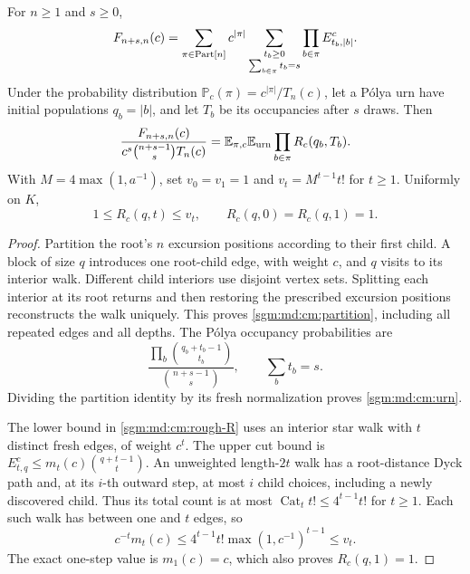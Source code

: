 \documentclass[11pt,letterpaper]{article}
\theoremstyle{remark}\newtheorem{remark}[theorem]{Remark}
\newcommand{\Cat}{\operatorname{Cat}}\newcommand{\E}{\mathbb E}\newcommand{\Prob}{\mathbb P}\newcommand{\ind}{\mathbf 1}
\theoremstyle{definition}\newtheorem{definition}[theorem]{Definition}
\begin{document}
\begin{proposition}\label{sgm:md:cm:branches}
For \(n\ge1\) and \(s\ge0\),
\begin{equation}\label{sgm:md:cm:partition}
 F_{n+s,n}(c)=
 \sum_{\pi\in\operatorname{Part}[n]}c^{|\pi|}
 \sum_{\substack{t_b\ge0\\\sum_{b\in\pi}t_b=s}}
          \prod_{b\in\pi}E^c_{t_b,|b|}.
\end{equation}
Under the probability distribution
\(\mathbb P_c(\pi)=c^{|\pi|}/T_n(c)\), let a P\'olya urn have
initial populations \(q_b=|b|\), and let \(T_b\) be its occupancies
after \(s\) draws. Then
\begin{equation}\label{sgm:md:cm:urn}
 \frac{F_{n+s,n}(c)}
 {c^s\binom{n+s-1}{s}T_n(c)}
 =\E_{\pi,c}\E_{\rm urn}\prod_{b\in\pi}R_c(q_b,T_b).
\end{equation}
With \(M=4\max(1,a^{-1})\), set \(v_0=v_1=1\) and
\(v_t=M^{t-1}t!\) for \(t\ge1\). Uniformly on \(K\),
\begin{equation}\label{sgm:md:cm:rough-R}
 1\le R_c(q,t)\le v_t,\qquad R_c(q,0)=R_c(q,1)=1.
\end{equation}
\end{proposition}

\begin{proof}
Partition the root's \(n\) excursion positions according to their
first child. A block of size \(q\) introduces one root-child edge,
with weight \(c\), and \(q\) visits to its interior walk.
Different child interiors use disjoint vertex sets. Splitting each
interior at its root returns and then restoring the prescribed
excursion positions reconstructs the walk uniquely. This proves
\eqref{sgm:md:cm:partition}, including all repeated edges and all depths.
The P\'olya occupancy probabilities are
\[
 \frac{\prod_b\binom{q_b+t_b-1}{t_b}}
      {\binom{n+s-1}{s}},\qquad \sum_b t_b=s.
\]
Dividing the partition identity by its fresh normalization proves
\eqref{sgm:md:cm:urn}.

The lower bound in \eqref{sgm:md:cm:rough-R} uses an interior star walk
with \(t\) distinct fresh edges, of weight \(c^t\).
The upper cut bound is
\(E^c_{t,q}\le m_t(c)\binom{q+t-1}{t}\).
An unweighted length-\(2t\) walk has a root-distance Dyck path and,
at its \(i\)-th outward step, at most \(i\) child choices, including
a newly discovered child. Thus its total count is at most
\(\Cat_t t!\le4^{t-1}t!\) for \(t\ge1\).
Each such walk has between one and \(t\) edges, so
\[
 c^{-t}m_t(c)
 \le4^{t-1}t!\max(1,c^{-1})^{t-1}\le v_t.
\]
The exact one-step value is \(m_1(c)=c\), which also proves
\(R_c(q,1)=1\).
\end{proof}
\end{document}
